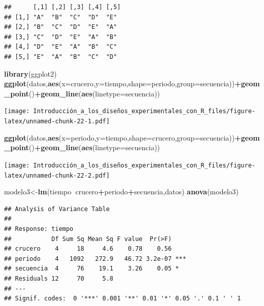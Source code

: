 \documentclass[]{book}
\newenvironment{Shaded}{\begin{snugshade}}{\end{snugshade}}
\newcommand{\KeywordTok}[1]{\textcolor[rgb]{0.13,0.29,0.53}{\textbf{#1}}}
\newcommand{\DataTypeTok}[1]{\textcolor[rgb]{0.13,0.29,0.53}{#1}}
\newcommand{\OperatorTok}[1]{\textcolor[rgb]{0.81,0.36,0.00}{\textbf{#1}}}
\newcommand{\NormalTok}[1]{#1}
\begin{document}
\begin{verbatim}
##      [,1] [,2] [,3] [,4] [,5]
## [1,] "A"  "B"  "C"  "D"  "E" 
## [2,] "B"  "C"  "D"  "E"  "A" 
## [3,] "C"  "D"  "E"  "A"  "B" 
## [4,] "D"  "E"  "A"  "B"  "C" 
## [5,] "E"  "A"  "B"  "C"  "D"
\end{verbatim}

\begin{Shaded}
\begin{Highlighting}[]
\KeywordTok{library}\NormalTok{(ggplot2)}
\KeywordTok{ggplot}\NormalTok{(datos,}\KeywordTok{aes}\NormalTok{(}\DataTypeTok{x=}\NormalTok{crucero,}\DataTypeTok{y=}\NormalTok{tiempo,}\DataTypeTok{shape=}\NormalTok{periodo,}\DataTypeTok{group=}\NormalTok{secuencia))}\OperatorTok{+}\KeywordTok{geom_point}\NormalTok{()}\OperatorTok{+}\KeywordTok{geom_line}\NormalTok{(}\KeywordTok{aes}\NormalTok{(}\DataTypeTok{linetype=}\NormalTok{secuencia))}
\end{Highlighting}
\end{Shaded}

\texttt{[image: Introducción\_a\_los\_diseños\_experimentales\_con\_R\_files/figure-latex/unnamed-chunk-22-1.pdf]}

\begin{Shaded}
\begin{Highlighting}[]
\KeywordTok{ggplot}\NormalTok{(datos,}\KeywordTok{aes}\NormalTok{(}\DataTypeTok{x=}\NormalTok{periodo,}\DataTypeTok{y=}\NormalTok{tiempo,}\DataTypeTok{shape=}\NormalTok{crucero,}\DataTypeTok{group=}\NormalTok{secuencia))}\OperatorTok{+}\KeywordTok{geom_point}\NormalTok{()}\OperatorTok{+}\KeywordTok{geom_line}\NormalTok{(}\KeywordTok{aes}\NormalTok{(}\DataTypeTok{linetype=}\NormalTok{secuencia))}
\end{Highlighting}
\end{Shaded}

\texttt{[image: Introducción\_a\_los\_diseños\_experimentales\_con\_R\_files/figure-latex/unnamed-chunk-22-2.pdf]}

\begin{Shaded}
\begin{Highlighting}[]
\NormalTok{modelo3<-}\KeywordTok{lm}\NormalTok{(tiempo}\OperatorTok{~}\NormalTok{crucero}\OperatorTok{+}\NormalTok{periodo}\OperatorTok{+}\NormalTok{secuencia,datos)}
\KeywordTok{anova}\NormalTok{(modelo3)}
\end{Highlighting}
\end{Shaded}

\begin{verbatim}
## Analysis of Variance Table
## 
## Response: tiempo
##           Df Sum Sq Mean Sq F value  Pr(>F)    
## crucero    4     18     4.6    0.78    0.56    
## periodo    4   1092   272.9   46.72 3.2e-07 ***
## secuencia  4     76    19.1    3.26    0.05 *  
## Residuals 12     70     5.8                    
## ---
## Signif. codes:  0 '***' 0.001 '**' 0.01 '*' 0.05 '.' 0.1 ' ' 1
\end{verbatim}
\end{document}
